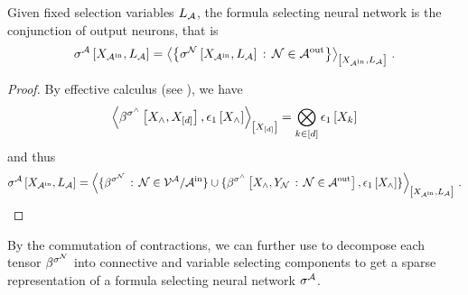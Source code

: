 \begin{theorem}
    Given fixed selection variables $L_{\mathcal{A}}$, the formula selecting neural network is the conjunction of output neurons, that is
    \begin{align*}
        \fsnnat{\catvariableof{\inneuronset},\selvariableof{\larchitecture}} %
        = \contractionof{\left\{\lneuractivationat{\catvariableof{\inneuronset},\selvariableof{\larchitecture}} \wcols \lneuron\in\outneuronset\right\}}{\catvariableof{\inneuronset},\selvariableof{\larchitecture}} \, .
    \end{align*}
\end{theorem}
\begin{proof}
    By effective calculus (see ), we have
    \[ \contractionof{\bsencodingofat{\land}{\catvariableof{\land},\shortcatvariables},\tbasisat{\catvariableof{\land}}}{\shortcatvariables} = \bigotimes_{\catenumeratorin} \tbasisat{\catvariableof{\catenumerator}} \]
    and thus
    \begin{align*}
        \fsnnat{\catvariableof{\inneuronset},\selvariableof{\larchitecture}}
        = \contractionof{
            \{\bsencodingof{\lneuron} \wcols \lneuron\in\nodesof{\larchitecture}/\inneuronset \} \cup \{\bsencodingofat{\land}{\catvariableof{\land},\headvariableof{\lneuron}  \wcols \lneuron\in\outneuronset}, \tbasisat{\catvariableof{\land}}\}
        }{\catvariableof{\inneuronset},\selvariableof{\larchitecture}} \, .
    \end{align*}
\end{proof}


By the commutation of contractions, we can further use  to decompose each tensor $\beta^{\sigma^{\mathcal{N}}}$ into connective and variable selecting components to get a sparse representation of a formula selecting neural network $\sigma^{\mathcal{A}}$.





